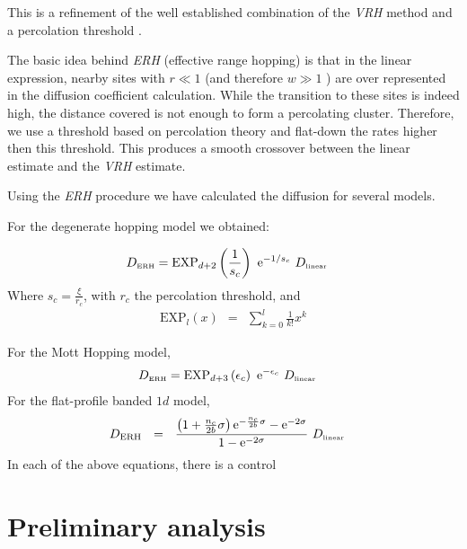 This is a refinement of the well established combination
of the \emph{VRH} method and a percolation threshold
 \cite{miller_impurity_1960,ambegaokar_hopping_1971,halperin_remarks_1989,pollak_percolation_1972}.


The basic idea behind \emph{ERH} (effective range hopping) is that in the linear
expression, nearby sites 
with $r\ll 1$ (and therefore $w \gg 1$ ) are over represented in
the diffusion coefficient calculation. While the transition to
these sites is indeed high, the distance covered is not enough
to form a percolating cluster. Therefore, we use a threshold based
on percolation theory and flat-down the rates higher then this threshold.
This produces a smooth crossover between the linear
estimate and the \emph{VRH} estimate.


Using the \emph{ERH} procedure we have calculated the diffusion for several models.


For the degenerate hopping model we obtained:

\begin{align}
D_{\tbox{ERH}} &=  \mathrm{EXP}_{d{+}2}\left(\frac{1}{s_c}\right)  \  \eexp{-1/s_c}  \ D_{\tbox{linear}}
\end{align}
%
Where $s_c=\frac{\xi}{r_c}$, with $r_c$ the percolation threshold, and
\begin{align}
\mathrm{EXP}_{l}(x) \ \ =\ \ \sum_{k=0}^l \frac{1}{k!}x^k
\end{align}


For the Mott Hopping model,
%
\begin{align}
D_{\tbox{ERH}} &=\mathrm{EXP}_{d{+}3}\left(\epsilon_c\right)  \  \eexp{-\epsilon_c}  \ D_{\tbox{linear}}
\end{align}
%
For the flat-profile banded $1d$ model,
\begin{align}
D_{\text{ERH}} \ \ &=\ \ \frac{\left(1+\frac{n_c}{2b}\sigma\right)\eexp{-\frac{n_c}{2b}\sigma} - \eexp{-2\sigma}}
       {1 - \eexp{-2\sigma}}
   \ D_{\tbox{linear}}
\end{align}
In each of the above equations, there is a control


\chapter{Preliminary analysis}



